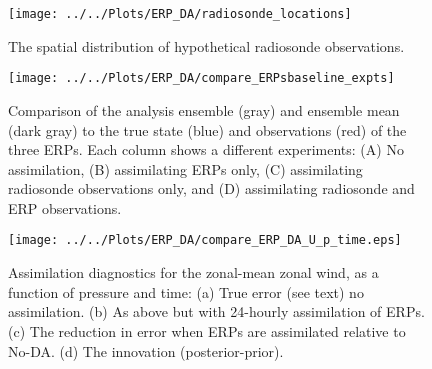 \documentclass[draft,jgrga]{agutex}
\begin{document}
\begin{article}
\begin{thebibliography}{}
\end{thebibliography}



%

%
%
\end{article}
\newpage
%
%
%
 \begin{figure}
 \centerline{
 \texttt{[image: ../../Plots/ERP\_DA/radiosonde\_locations]}}
 \caption{The spatial distribution of hypothetical radiosonde observations.}
 \label{fig:RS}
\end{figure}


 \begin{figure}
\texttt{[image: ../../Plots/ERP\_DA/compare\_ERPsbaseline\_expts]} 
 \caption{Comparison of the analysis ensemble (gray) and ensemble mean (dark gray) to the true state (blue) and observations (red) of the three ERPs.  Each column shows a different experiments: (A) No assimilation, (B) assimilating ERPs only, (C) assimilating radiosonde observations only, and (D) assimilating radiosonde and ERP observations.}
 \label{fig:ERPs}
\end{figure}

 \begin{figure}
\texttt{[image: ../../Plots/ERP\_DA/compare\_ERP\_DA\_U\_p\_time.eps]} 
 \caption{Assimilation diagnostics for the zonal-mean zonal wind, as a function of pressure and time: (a) True error (see text)  no assimilation.  (b) As above but with 24-hourly assimilation of ERPs.  (c) The reduction in error when ERPs are assimilated relative to No-DA.  (d) The innovation (posterior-prior).}
 \label{fig:ERP_DA_U_p_time}
\end{figure}
\end{document}
